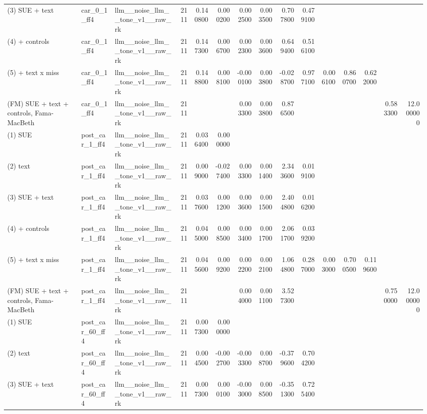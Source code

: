 \begin{table}
\begin{tabular}{lllrrrrrrrrrrrr}
(3) SUE + text & car\_0\_1\_ff4 & llm\_\_noise\_llm\_\_tone\_v1\_\_raw\_rk & 2111 & 0.140800 & 0.000200 & 0.002500 & 0.003500 & 0.707800 & 0.479100 &  &  &  &  &  \\
(4) + controls & car\_0\_1\_ff4 & llm\_\_noise\_llm\_\_tone\_v1\_\_raw\_rk & 2111 & 0.147300 & 0.006700 & 0.002300 & 0.003600 & 0.649400 & 0.516100 &  &  &  &  &  \\
(5) + text x miss & car\_0\_1\_ff4 & llm\_\_noise\_llm\_\_tone\_v1\_\_raw\_rk & 2111 & 0.148800 & 0.008100 & -0.000100 & 0.003800 & -0.028700 & 0.977100 & 0.006100 & 0.860700 & 0.622000 &  &  \\
(FM) SUE + text + controls, Fama-MacBeth & car\_0\_1\_ff4 & llm\_\_noise\_llm\_\_tone\_v1\_\_raw\_rk & 2111 &  &  & 0.003300 & 0.003800 & 0.876500 &  &  &  &  & 0.583300 & 12.000000 \\
(1) SUE & post\_car\_1\_ff4 & llm\_\_noise\_llm\_\_tone\_v1\_\_raw\_rk & 2111 & 0.036400 & 0.000000 &  &  &  &  &  &  &  &  &  \\
(2) text & post\_car\_1\_ff4 & llm\_\_noise\_llm\_\_tone\_v1\_\_raw\_rk & 2111 & 0.009000 & -0.027400 & 0.003300 & 0.001400 & 2.343600 & 0.019100 &  &  &  &  &  \\
(3) SUE + text & post\_car\_1\_ff4 & llm\_\_noise\_llm\_\_tone\_v1\_\_raw\_rk & 2111 & 0.037600 & 0.001200 & 0.003600 & 0.001500 & 2.404800 & 0.016200 &  &  &  &  &  \\
(4) + controls & post\_car\_1\_ff4 & llm\_\_noise\_llm\_\_tone\_v1\_\_raw\_rk & 2111 & 0.045000 & 0.008500 & 0.003400 & 0.001700 & 2.061700 & 0.039200 &  &  &  &  &  \\
(5) + text x miss & post\_car\_1\_ff4 & llm\_\_noise\_llm\_\_tone\_v1\_\_raw\_rk & 2111 & 0.045600 & 0.009200 & 0.002200 & 0.002100 & 1.064800 & 0.287000 & 0.003000 & 0.700500 & 0.119600 &  &  \\
(FM) SUE + text + controls, Fama-MacBeth & post\_car\_1\_ff4 & llm\_\_noise\_llm\_\_tone\_v1\_\_raw\_rk & 2111 &  &  & 0.004000 & 0.001100 & 3.527300 &  &  &  &  & 0.750000 & 12.000000 \\
(1) SUE & post\_car\_60\_ff4 & llm\_\_noise\_llm\_\_tone\_v1\_\_raw\_rk & 2111 & 0.007300 & 0.000000 &  &  &  &  &  &  &  &  &  \\
(2) text & post\_car\_60\_ff4 & llm\_\_noise\_llm\_\_tone\_v1\_\_raw\_rk & 2111 & 0.004500 & -0.002700 & -0.003300 & 0.008700 & -0.379600 & 0.704200 &  &  &  &  &  \\
(3) SUE + text & post\_car\_60\_ff4 & llm\_\_noise\_llm\_\_tone\_v1\_\_raw\_rk & 2111 & 0.007300 & 0.000100 & -0.003000 & 0.008500 & -0.351300 & 0.725400 &  &  &  &  &  \\

\end{tabular}
\end{table}
